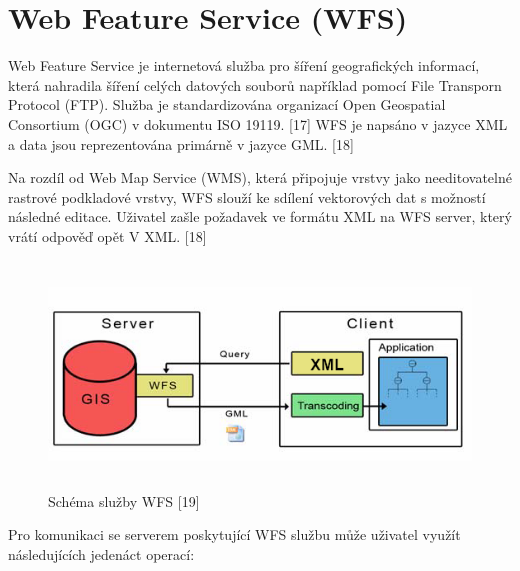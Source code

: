 \documentclass[a4paper,oneside,12pt]{book}
\begin{document}
\section{Web Feature Service (WFS)} \label{wfs}
Web Feature Service je internetová služba pro šíření geografických informací, která nahradila šíření celých datových souborů například pomocí File Transporn Protocol (FTP). Služba je standardizována organizací Open Geospatial Consortium (OGC) v dokumentu  ISO 19119. [17] WFS je napsáno v jazyce XML a data jsou reprezentována primárně v jazyce GML. [18]

Na rozdíl od Web Map Service (WMS), která připojuje vrstvy jako needitovatelné rastrové podkladové vrstvy, WFS slouží ke sdílení vektorových dat s možností následné editace. Uživatel zašle požadavek ve formátu XML na WFS server, který vrátí odpověď opět V XML. [18]

\begin{figure}[ht] \label{obr5}
\centering
\includegraphics[height=6cm]{pictures/XML.png}
\caption{Schéma služby WFS [19]}
\label{fig:xml}
\end{figure}

Pro komunikaci se serverem poskytující WFS službu může uživatel využít následujících jedenáct operací:
\end{document}
